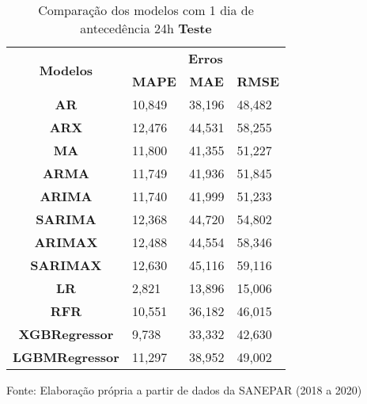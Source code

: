 \begin{table}[H]
	\centering
	\caption{Comparação dos modelos com 1 dia de antecedência 24h \textbf{Teste} }\label{tb:1-24tst}
	\begin{tabular}{@{}clll@{}}
		\toprule
		\multirow{2}{*}{\textbf{Modelos}} & \multicolumn{3}{c}{\textbf{Erros}}                                                                       \\ \cmidrule(l){2-4} 
		& \multicolumn{1}{c}{\textbf{MAPE}} & \multicolumn{1}{c}{\textbf{MAE}} & \multicolumn{1}{c}{\textbf{RMSE}} \\ \hline
\textbf{AR}                       & 10,849                            & 38,196                           & 48,482                            \\
\textbf{ARX}                      & 12,476                            & 44,531                           & 58,255                            \\
\textbf{MA}                       & 11,800                            & 41,355                           & 51,227                            \\
\textbf{ARMA}                     & 11,749                            & 41,936                           & 51,845                            \\
\textbf{ARIMA}                    & 11,740                            & 41,999                           & 51,233                            \\
\textbf{SARIMA}                   & 12,368                            & 44,720                           & 54,802                            \\
\textbf{ARIMAX}                   & 12,488                            & 44,554                           & 58,346                            \\
\textbf{SARIMAX}                  & 12,630                            & 45,116                           & 59,116                            \\
\textbf{LR}        & 2,821                             & 13,896                           & 15,006                            \\
\textbf{RFR}  & 10,551                            & 36,182                           & 46,015                            \\
\textbf{XGBRegressor}             & 9,738                             & 33,332                           & 42,630                            \\
\textbf{LGBMRegressor}            & 11,297                            & 38,952                           & 49,002                            \\ \bottomrule
	\end{tabular}

Fonte: Elaboração própria a partir de dados da SANEPAR (2018 a 2020)
\end{table}

